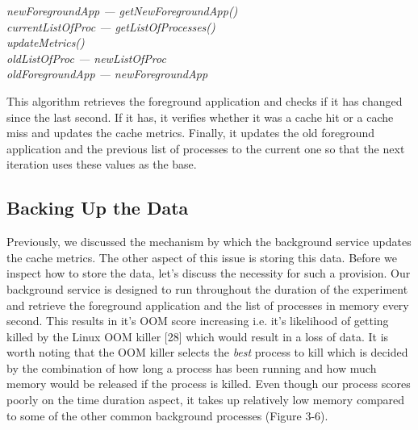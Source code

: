 \documentclass[12pt]{uthesis-v12}  %
\begin{document}
		 	\begin{algorithm}[H]
		 		\SetAlgoLined
		 				 		
		 		{	
		 			{\em newForegroundApp --- getNewForegroundApp()}\\
		 			{\em currentListOfProc --- getListOfProcesses()}\\	 			
		 			{\em updateMetrics()}\\
		 			{\em oldListOfProc --- newListOfProc}\\
		 			{\em oldForegroundApp --- newForegroundApp}		 			
		 		}
		 		
		 		\caption[Algorithm to update cache metrics]{This algorithm retrieves the foreground application and checks if it has changed since the last second. If it has, it verifies whether it was a cache hit or a cache miss and updates the cache metrics. Finally, it updates the old foreground application and the previous list of processes to the current one so that the next iteration uses these values as the base.}
		 	\end{algorithm}

		\subsection{Backing Up the Data}
			Previously, we discussed the mechanism by which the background service updates the cache metrics. The other aspect of this issue is storing this data. Before we inspect how to store the data, let's discuss the necessity for such a provision. Our background service is designed to run throughout the duration of the experiment and retrieve the foreground application and the list of processes in memory every second. This results in it's OOM score increasing i.e. it's likelihood of getting killed by the Linux OOM killer [28] which would result in a loss of data. It is worth noting that the OOM killer selects the {\em best} process to kill which is decided by the combination of how long a process has been running and how much memory would be released if the process is killed. Even though our process scores poorly on the time duration aspect, it takes up relatively low memory compared to some of the other common background processes (Figure 3-6).
\end{document}
